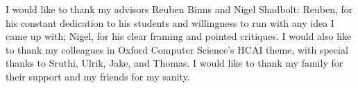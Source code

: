 I would like to thank my advisors Reuben Binns and Nigel Shadbolt: Reuben, for his constant dedication to his students and willingness to run with any idea I came up with; Nigel, for his clear framing and pointed critiques. I would also like to thank my colleagues in Oxford Computer Science's HCAI theme, with special thanks to Sruthi, Ulrik, Jake, and Thomas. I would like to thank my family for their support and my friends for my sanity.